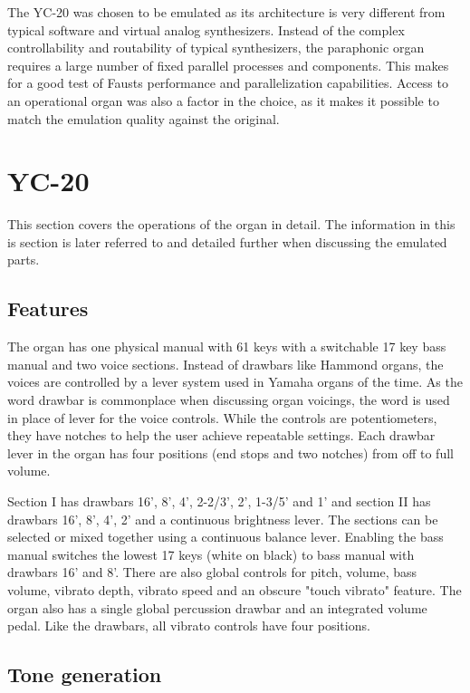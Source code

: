 \documentclass[11pt,a4paper]{article}
\begin{document}
The YC-20 was chosen to be emulated as its architecture is very different from typical software and virtual analog synthesizers. Instead of the complex controllability and routability of typical synthesizers, the paraphonic organ requires a large number of fixed parallel processes and components. This makes for a good test of Fausts performance and parallelization capabilities. Access to an operational organ was also a factor in the choice, as it makes it possible to match the emulation quality against the original. 

\section{YC-20}
\label{section:yc-20}

This section covers the operations of the organ in detail\cite{yamaha:yc20}. The information in this is section is later referred to and detailed further when discussing the emulated parts.

\subsection{Features}

The organ has one physical manual with 61 keys with a switchable 17 key bass manual and two voice sections. Instead of drawbars like Hammond organs, the voices are controlled by a lever system used in Yamaha organs of the time. As the word drawbar is commonplace when discussing organ voicings, the word is used in place of lever for the voice controls. While the controls are potentiometers, they have notches to help the user achieve repeatable settings. Each drawbar lever in the organ has four positions (end stops and two notches) from off to full volume. 

Section I has drawbars 16', 8', 4', 2-2/3', 2', 1-3/5' and 1' and section II has drawbars 16', 8', 4', 2' and a continuous brightness lever. The sections can be selected or mixed together using a continuous balance lever. Enabling the bass manual switches the lowest 17 keys (white on black) to bass manual with drawbars 16' and 8'. There are also global controls for pitch, volume, bass volume, vibrato depth, vibrato speed and an obscure "touch vibrato" feature. The organ also has a single global percussion drawbar and an integrated volume pedal. Like the drawbars, all vibrato controls have four positions.

\subsection{Tone generation}
\end{document}
